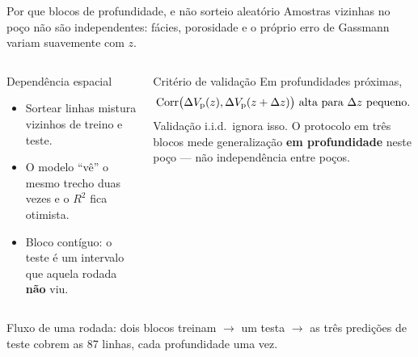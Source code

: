\documentclass[aspectratio=169,10pt]{beamer}
\begin{document}
\begin{frame}{Por que blocos de profundidade, e não sorteio aleatório}
  \footnotesize
  Amostras vizinhas no poço não são independentes: fácies, porosidade e o
  próprio erro de Gassmann variam suavemente com \(z\).
  \vspace{0.08cm}
  \begin{columns}[T,onlytextwidth]
    \begin{block}{Dependência espacial}
      \scriptsize
      \begin{itemize}
        \item Sortear linhas mistura vizinhos de treino e teste.
        \item O modelo ``vê'' o mesmo trecho duas vezes e o \(R^2\)
              fica otimista.
        \item Bloco contíguo: o teste é um intervalo que aquela rodada
              \textbf{não} viu.
      \end{itemize}
    \end{block}
    \begin{exampleblock}{Critério de validação}
      \scriptsize
      Em profundidades próximas,
      \[
        \mathrm{Corr}\bigl(\Delta V_{\mathrm{p}}(z),\Delta V_{\mathrm{p}}(z+\Delta z)\bigr)
        \ \text{alta para }\Delta z\text{ pequeno.}
      \]
      Validação i.i.d.\ ignora isso. O protocolo em três blocos mede
      generalização \textbf{em profundidade} neste poço --- não
      independência entre poços.
    \end{exampleblock}
  \end{columns}
  \vspace{0.08cm}
  {\scriptsize Fluxo de uma rodada: dois blocos treinam $\rightarrow$ um
  testa $\rightarrow$ as três predições de teste cobrem as 87 linhas,
  cada profundidade uma vez.}
\end{frame}
\end{document}
